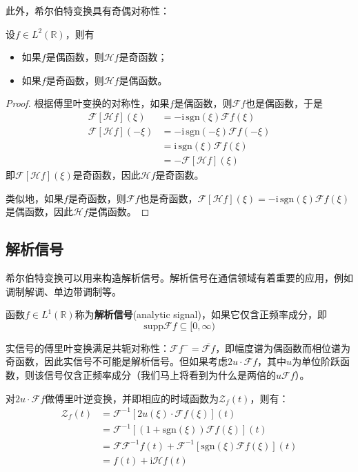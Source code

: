 \documentclass{ctexbook}
\begin{document}
此外，希尔伯特变换具有奇偶对称性：
\begin{theorem}
    设$f\in L^2(\mathbb{R})$，则有
    \begin{itemize}
        \item 如果$f$是偶函数，则$\mathcal{H} f$是奇函数；
        \item 如果$f$是奇函数，则$\mathcal{H} f$是偶函数。
    \end{itemize}
\end{theorem}
\begin{proof}
    根据傅里叶变换的对称性，如果$f$是偶函数，则$\mathcal{F} f$也是偶函数，于是\begin{align*}
        \mathcal{F} [\mathcal{H} f](\xi)&=-\mathrm{i}\,\text{sgn}(\xi)\mathcal{F} f(\xi)\\
        \mathcal{F}[\mathcal{H} f](-\xi)&=-\mathrm{i}\,\text{sgn}(-\xi)\mathcal{F} f(-\xi)\\
        &=\mathrm{i}\,\text{sgn}(\xi)\mathcal{F} f(\xi)\\
        &=-\mathcal{F} [\mathcal{H} f](\xi)
    \end{align*}
    即$\mathcal{F} [\mathcal{H} f](\xi)$是奇函数，因此$\mathcal{H} f$是奇函数。
    
    类似地，如果$f$是奇函数，则$\mathcal{F} f$也是奇函数，$\mathcal{F} [\mathcal{H} f](\xi)=-\mathrm{i}\,\text{sgn}(\xi)\mathcal{F} f(\xi)$是偶函数，因此$\mathcal{H} f$是偶函数。
\end{proof}

\subsection{解析信号}\label{sub:analytic_signal}

希尔伯特变换可以用来构造解析信号。解析信号在通信领域有着重要的应用，例如调制解调、单边带调制等。
\begin{definition}[解析信号]
    函数$f\in L^1(\mathbb{R})$称为\textbf{解析信号}(analytic signal)，如果它仅含正频率成分，即
    \[\text{supp}\mathcal{F} f\subseteq[0,\infty)\]
\end{definition}

实信号的傅里叶变换满足共轭对称性：$\mathcal{F} f^-=\overline{\mathcal{F} f}$，即幅度谱为偶函数而相位谱为奇函数，因此实信号不可能是解析信号。但如果考虑$2u\cdot\mathcal{F} f$，其中$u$为单位阶跃函数，则该信号仅含正频率成分（我们马上将看到为什么是两倍的$u\mathcal{F} f$）。

对$2u\cdot\mathcal{F} f$做傅里叶逆变换，并即相应的时域函数为$\mathcal{Z}_f(t)$，则有：
\begin{align*}
    \mathcal{Z}_f(t)&=\mathcal{F} ^{-1}[2u(\xi)\cdot\mathcal{F} f(\xi)](t)\\
    &=\mathcal{F} ^{-1}[(1+\text{sgn}(\xi))\mathcal{F} f(\xi)](t)\\
    &=\mathcal{F} \mathcal{F} ^{-1}f(t)+\mathcal{F} ^{-1}[\text{sgn}(\xi)\mathcal{F} f(\xi)](t)\\
    &=f(t)+\mathrm{i}\mathcal{H} f(t)
\end{align*}
\end{document}
